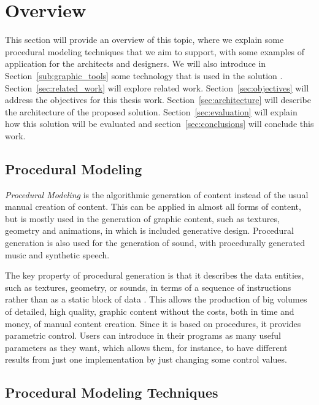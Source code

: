 
% 
% 

\section{Overview} %
\label{sec:overview}


This section will provide an overview of this topic, where we explain some procedural modeling techniques that we aim to support, with some examples of application for the architects and designers. We will also introduce in Section~\ref{sub:graphic_tools} some technology that is used in the solution .  Section~\ref{sec:related_work} will explore related work. Section~\ref{sec:objectives} will address the objectives for this thesis work. Section~\ref{sec:architecture} will describe the architecture of the proposed solution. Section~\ref{sec:evaluation} will explain how this solution will be evaluated and section~\ref{sec:conclusions} will conclude this work.

\subsection{Procedural Modeling} %
\label{sub:procedural_modeling}

\emph{Procedural Modeling} is the algorithmic generation of content instead of the usual manual creation of content. This can be applied in almost all forms of content, but is mostly used in the generation of graphic content, such as textures, geometry and animations, in which is included generative design. Procedural generation is also used for the generation of sound, with procedurally generated music and synthetic speech.

The key property of procedural generation is that it describes the data entities, such as textures, geometry, or sounds, in terms of a sequence of instructions rather than as a static block of data \cite{Kelly}. This allows the production of big volumes of detailed, high quality, graphic content without the costs, both in time and money, of manual content creation. Since it is based on procedures, it provides parametric control. Users can introduce in their programs as many useful parameters as they want, which allows them, for instance, to have different results from just one implementation by just changing some control values.


\subsection{Procedural Modeling Techniques} %
\label{sub:procedural_modeling_techniques}

